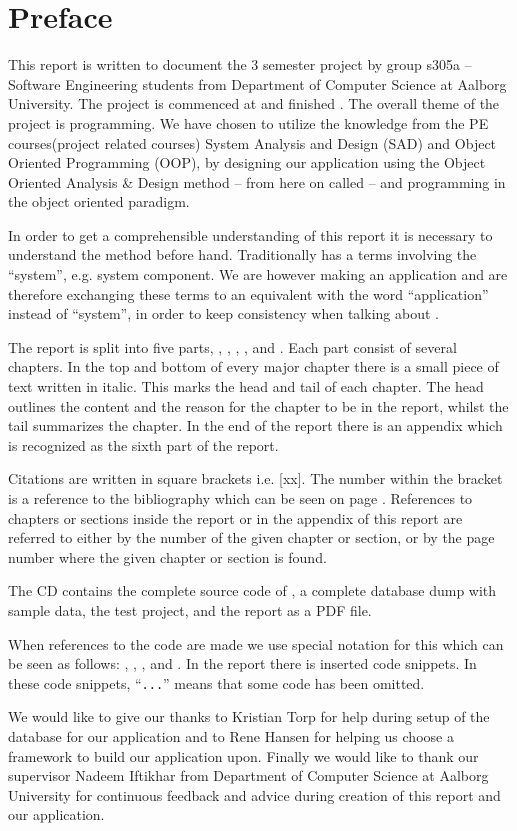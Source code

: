 \chapter*{Preface}
\label{chap:preface}
%
\emptyTop{}%
\vspace{-15mm}%
This report is written to document the 3\rd{} semester project by group s305a -- Software Engineering students from Department of Computer Science at Aalborg University. 
The project is commenced at  and finished .
The overall theme of the project is programming. 
We have chosen to utilize the knowledge from the PE courses(project related courses) System Analysis and Design (SAD) and Object Oriented Programming (OOP), by designing our application using the Object Oriented Analysis \& Design method -- from here on called \ooad[] -- and programming \hdesk[] in the object oriented paradigm.

In order to get a comprehensible understanding of this report it is necessary to understand the \ooad[] method before hand.
Traditionally \ooad[] has a terms involving the ``system'', e.g. system component.
We are however making an application and are therefore exchanging these terms to an equivalent with the word ``application'' instead of ``system'', in order to keep consistency when talking about \hdesk[].

The report is split into five parts, , , , , and .
Each part consist of several chapters.
In the top and bottom of every major chapter there is a small piece of text written in italic.
This marks the head and tail of each chapter.
The head outlines the content and the reason for the chapter to be in the report, whilst the tail summarizes the chapter.
In the end of the report there is an appendix which is recognized as the sixth part of the report.

Citations are written in square brackets i.e. [xx].
The number within the bracket is a reference to the bibliography which can be seen on page \pageref{chap:bib}.
References to chapters or sections inside the report or in the appendix of this report are referred to either by the number of the given chapter or section, or by the page number where the given chapter or section is found.

The CD contains the complete source code of \hdesk[], a complete database dump with sample data, the test project, and the report as a PDF file.  

When references to the code are made we use special notation for this which can be seen as follows: , , , and .
In the report there is inserted code snippets.
In these code snippets, ``\verb|...|'' means that some code has been omitted.

We would like to give our thanks to Kristian Torp for help during setup of the database for our application and to Rene Hansen for helping us choose a framework to build our application upon.
Finally we would like to thank our supervisor Nadeem Iftikhar from Department of Computer Science at Aalborg University for continuous feedback and advice during creation of this report and our application.